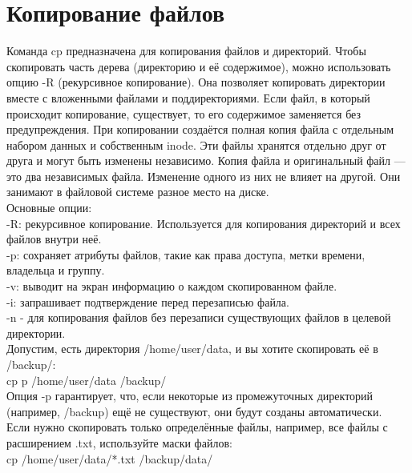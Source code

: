 \section{Копирование файлов}
Команда cp предназначена для копирования файлов и директорий. Чтобы скопировать часть дерева (директорию и её содержимое), можно использовать опцию -R (рекурсивное копирование). Она позволяет копировать директории вместе с вложенными файлами и поддиректориями. Если файл, в который происходит копирование, существует, то его содержимое заменяется без предупреждения. При копировании создаётся полная копия файла с отдельным набором данных и собственным inode. Эти файлы хранятся отдельно друг от друга и могут быть изменены независимо. Копия файла и оригинальный файл — это два независимых файла. Изменение одного из них не влияет на другой. Они занимают в файловой системе разное место на диске. \\
Основные опции: \\
-R: рекурсивное копирование. Используется для копирования директорий и всех файлов внутри неё. \\
-p: сохраняет атрибуты файлов, такие как права доступа, метки времени, владельца и группу. \\
-v: выводит на экран информацию о каждом скопированном файле. \\
-i: запрашивает подтверждение перед перезаписью файла. \\
-n - для копирования файлов без перезаписи существующих файлов в целевой директории. \\
Допустим, есть директория /home/user/data, и вы хотите скопировать её в /backup/: \\
cp p /home/user/data /backup/ \\
Опция -p гарантирует, что, если некоторые из промежуточных директорий (например, /backup) ещё не существуют, они будут созданы автоматически. \\
Если нужно скопировать только определённые файлы, например, все файлы с расширением .txt, используйте маски файлов: \\
cp /home/user/data/*.txt /backup/data/ \\

